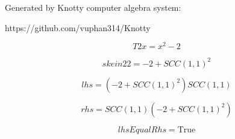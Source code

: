 \documentclass[letterpaper, 10pt]{extarticle}
\begin{document}
Generated by Knotty computer algebra system:

https://github.com/vuphan314/Knotty

\hrulefill

\bigskip

\begin{dmath*}
T2x =
    x^{2} - 2
\end{dmath*}


\begin{dmath*}
skein22 =
    -2 + SCC(1, 1)^{2}
\end{dmath*}


\begin{dmath*}
lhs =
    \left(-2 + SCC(1, 1)^{2}\right) SCC(1, 1)
\end{dmath*}


\begin{dmath*}
rhs =
    SCC(1, 1) \left(-2 + SCC(1, 1)^{2}\right)
\end{dmath*}


\begin{dmath*}
lhsEqualRhs =
    \mathrm{True}
\end{dmath*}
\end{document}

